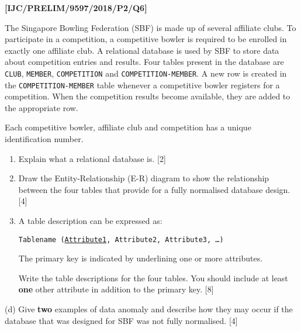 \item \textbf{{[}IJC/PRELIM/9597/2018/P2/Q6{]} }

The Singapore Bowling Federation (SBF) is made up of several affiliate
clubs. To participate in a competition, a competitive bowler is required
to be enrolled in exactly one affiliate club. A relational database
is used by SBF to store data about competition entries and results.
Four tables present in the database are \texttt{CLUB}, \texttt{MEMBER},
\texttt{COMPETITION} and \texttt{COMPETITION-MEMBER}. A new row is
created in the \texttt{COMPETITION-MEMBER} table whenever a competitive
bowler registers for a competition. When the competition results become
available, they are added to the appropriate row.

Each competitive bowler, affiliate club and competition has a unique
identification number.
\begin{enumerate}
\item Explain what a relational database is.\hfill{} {[}2{]}
\item Draw the Entity-Relationship (E-R) diagram to show the relationship
between the four tables that provide for a fully normalised database
design. \hfill{}{[}4{]}
\item A table description can be expressed as:

\texttt{Tablename (}\texttt{\uline{Attribute1}}\texttt{, Attribute2,
Attribute3, \dots ) }

The primary key is indicated by underlining one or more attributes.

Write the table descriptions for the four tables. You should include
at least \textbf{one} other attribute in addition to the primary key.
\hfill{}{[}8{]}
\end{enumerate}
(d) Give \textbf{two} examples of data anomaly and describe how they
may occur if the database that was designed for SBF was not fully
normalised.\hfill{} {[}4{]}